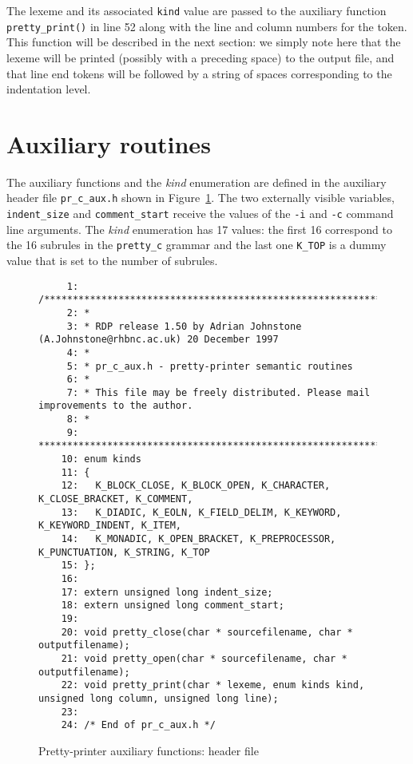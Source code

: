 The lexeme and its associated {\tt kind} value are passed to the auxiliary function
\verb+pretty_print()+ in line 52 along with the line and column numbers for the token.
This function will be described in the next section: we simply note here that the lexeme
will be printed (possibly with a preceding space) to the output file, and that line end
tokens will be followed by a string of spaces corresponding to the indentation level.

\section{Auxiliary routines}

The auxiliary functions and the {\em kind} enumeration are defined in
the auxiliary header file \verb+pr_c_aux.h+ shown in
Figure~\ref{pr_c_aux.h}. The two externally visible variables,
\verb+indent_size+ and \verb+comment_start+ receive the values of the
{\tt -i} and {\tt -c} command line arguments. The {\em kind} enumeration
has 17 values: the first 16 correspond to the 16 subrules in the
\verb+pretty_c+ grammar and the last one \verb+K_TOP+ is a dummy value
that is set to the number of subrules.

\begin{figure}
\hspace*{-2cm}
\begin{minipage}{30cm}
\footnotesize
\begin{verbatim}
     1: /****************************************************************************
     2: *
     3: * RDP release 1.50 by Adrian Johnstone (A.Johnstone@rhbnc.ac.uk) 20 December 1997
     4: *
     5: * pr_c_aux.h - pretty-printer semantic routines
     6: *
     7: * This file may be freely distributed. Please mail improvements to the author.
     8: *
     9: ****************************************************************************/
    10: enum kinds
    11: {
    12:   K_BLOCK_CLOSE, K_BLOCK_OPEN, K_CHARACTER, K_CLOSE_BRACKET, K_COMMENT, 
    13:   K_DIADIC, K_EOLN, K_FIELD_DELIM, K_KEYWORD, K_KEYWORD_INDENT, K_ITEM, 
    14:   K_MONADIC, K_OPEN_BRACKET, K_PREPROCESSOR, K_PUNCTUATION, K_STRING, K_TOP
    15: }; 
    16: 
    17: extern unsigned long indent_size; 
    18: extern unsigned long comment_start; 
    19: 
    20: void pretty_close(char * sourcefilename, char * outputfilename); 
    21: void pretty_open(char * sourcefilename, char * outputfilename); 
    22: void pretty_print(char * lexeme, enum kinds kind, unsigned long column, unsigned long line); 
    23: 
    24: /* End of pr_c_aux.h */
\end{verbatim}
\end{minipage}
\caption{Pretty-printer auxiliary functions: header file}
\label{pr_c_aux.h}
\end{figure}


